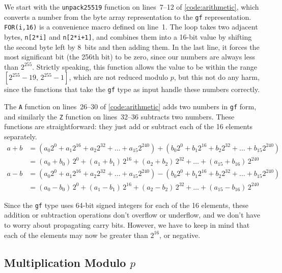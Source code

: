 \documentclass{article}
\begin{document}
We start with the \verb|unpack25519| function on lines~7--12 of \autoref{code:arithmetic}, which converts a number from the byte array representation to the \verb|gf| representation.
\verb|FOR(i,16)| is a convenience macro defined on line~1.
The loop takes two adjacent bytes, \verb|n[2*i]| and \verb|n[2*i+1]|, and combines them into a 16-bit value by shifting the second byte left by 8~bits and then adding them.
In the last line, it forces the most significant bit (the 256th bit) to be zero, since our numbers are always less than $2^{255}$.
Strictly speaking, this function allows the value to be within the range $[2^{255} - 19,\, 2^{255} - 1]$, which are not reduced modulo $p$, but this not do any harm, since the functions that take the \verb|gf| type as input handle these numbers correctly.

The \verb|A| function on lines~26--30 of \autoref{code:arithmetic} adds two numbers in \verb|gf| form, and similarly the \verb|Z| function on lines~32--36 subtracts two numbers.
These functions are straightforward: they just add or subtract each of the 16 elements separately.
\begin{align*}
    a + b &= (a_0 2^0 + a_1 2^{16} + a_2 2^{32} + \dots + a_{15} 2^{240}) + (b_0 2^0 + b_1 2^{16} + b_2 2^{32} + \dots + b_{15} 2^{240}) \\
    &= (a_0 + b_0)\, 2^0 + (a_1 + b_1)\, 2^{16} + (a_2 + b_2)\, 2^{32} + \dots + (a_{15} + b_{16})\, 2^{240} \\[6pt]
    a - b &= (a_0 2^0 + a_1 2^{16} + a_2 2^{32} + \dots + a_{15} 2^{240}) - (b_0 2^0 + b_1 2^{16} + b_2 2^{32} + \dots + b_{15} 2^{240}) \\
    &= (a_0 - b_0)\, 2^0 + (a_1 - b_1)\, 2^{16} + (a_2 - b_2)\, 2^{32} + \dots + (a_{15} - b_{16})\, 2^{240}
\end{align*}

Since the \verb|gf| type uses 64-bit signed integers for each of the 16 elements, these addition or subtraction operations don't overflow or underflow, and we don't have to worry about propagating carry bits.
However, we have to keep in mind that each of the elements may now be greater than $2^{16}$, or negative.

\subsection{Multiplication Modulo $p$}
\end{document}
